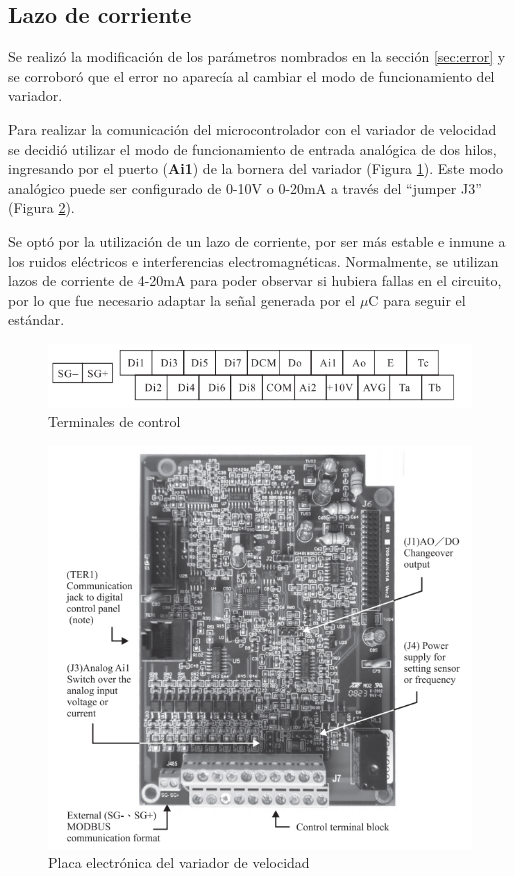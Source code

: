 \subsection{Lazo de corriente} \label{sec:lazoI}

Se realizó la modificación de los parámetros nombrados en la sección \ref{sec:error} y se corroboró que el error no aparecía al cambiar el modo de funcionamiento del variador.

Para realizar la comunicación del microcontrolador con el variador de velocidad se decidió utilizar el modo de funcionamiento de entrada analógica de dos hilos, ingresando por el puerto (\textbf{Ai1}) de la bornera del variador (Figura \ref{fig:born}). Este modo analógico puede ser configurado de 0-10V o 0-20mA a través del “jumper J3” (Figura \ref{fig:placals}).

Se optó por la utilización de un lazo de corriente, por ser más estable e inmune a los ruidos eléctricos e interferencias electromagnéticas. Normalmente, se utilizan lazos de corriente de 4-20mA para poder observar si hubiera fallas en el circuito, por lo que fue necesario adaptar la señal generada por el $\mu$C para seguir el estándar.



\begin{figure}[h]
	\centering
	\includegraphics[width=0.7\linewidth]{imagenes/terminales.png}
	\caption{Terminales de control}
	\label{fig:born}
\end{figure}

\begin{figure}[htbp]
	\centering
\includegraphics[width=0.7\linewidth]{imagenes/placa_ls}
\caption{Placa electrónica del variador de velocidad}
\label{fig:placals}
\end{figure}

